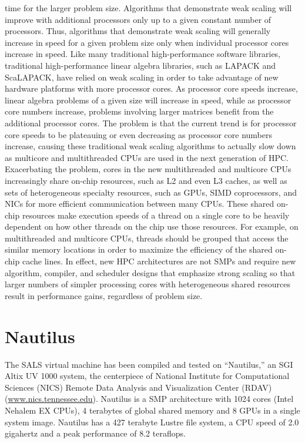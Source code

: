 time for the larger problem size.  Algorithms that demonstrate weak
scaling will improve with additional processors only up to a given
constant number of processors.  Thus, algorithms that demonstrate weak
scaling will generally increase in speed for a given problem size only
when individual processor cores increase in speed.  Like many
traditional high-performance software libraries, traditional
high-performance linear algebra libraries, such as LAPACK and
ScaLAPACK, have relied on weak scaling in order to take advantage of
new hardware platforms with more processor cores.  As processor core
speeds increase, linear algebra problems of a given size will increase
in speed, while as processor core numbers increase, problems involving
larger matrices benefit from the additional processor cores.  The
problem is that the current trend is for processor core speeds to be
plateauing or even decreasing as processor core numbers increase,
causing these traditional weak scaling algorithms to actually slow
down as multicore and multithreaded CPUs are used in the next
generation of HPC.  Exacerbating the problem, cores in the new
multithreaded and multicore CPUs increasingly share on-chip resources,
such as L2 and even L3 caches, as well as sets of heterogeneous
specialty resources, such as GPUs, SIMD coprocessors, and NICs for
more efficient communication between many CPUs.  These shared on-chip
resources make execution speeds of a thread on a single core to be
heavily dependent on how other threads on the chip use those
resources.  For example, on multithreaded and multicore CPUs, threads
should be grouped that access the similar memory locations in order to
maximize the efficiency of the shared on-chip cache lines.  In effect,
new HPC architectures are not SMPs and require new algorithm,
compiler, and scheduler designs that emphasize strong scaling so that
larger numbers of simpler processing cores with heterogeneous shared
resources result in performance gains, regardless of problem size.

\section{Nautilus}

The SALS virtual machine has been compiled and tested on ``Nautilus,''
an SGI Altix UV 1000 system, the centerpiece of National Institute for
Computational Sciences (NICS) Remote Data Analysis and Visualization
Center (RDAV) (\url{www.nics.tennessee.edu}).  Nautilus is a SMP
architecture with 1024 cores (Intel Nehalem EX CPUs), 4 terabytes of
global shared memory and 8 GPUs in a single system image.  Nautilus
has a 427 terabyte Lustre file system, a CPU speed of 2.0 gigahertz
and a peak performance of 8.2 teraflops.


